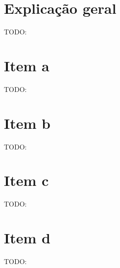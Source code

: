 \documentclass[12pt, twoside, a4paper]{article}
\newcommand{\todo}[1]{{\color{red} TODO: #1}}
\begin{document}
\section{Explicação geral}%

\todo{}

\section{Item a}%
\todo{}

\section{Item b}%
\todo{}

\section{Item c}%
\todo{}

\section{Item d}%
\todo{}
\end{document}
